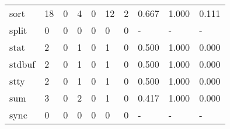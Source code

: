 \begin{longtable}{lp{2.0cm}p{2.0cm}p{2.0cm}p{2.0cm}p{2.0cm}p{2.0cm}p{2.0cm}p{2.0cm}p{2.0cm}}
sort      &                     18 &                                             0 &                                            4 &                                           0 &                                           12 &                                          2 &                                0.667 &                                  1.000 &                                0.111 \\
split     &                      0 &                                             0 &                                            0 &                                           0 &                                            0 &                                          0 &                                    - &                                      - &                                    - \\
stat      &                      2 &                                             0 &                                            1 &                                           0 &                                            1 &                                          0 &                                0.500 &                                  1.000 &                                0.000 \\
stdbuf    &                      2 &                                             0 &                                            1 &                                           0 &                                            1 &                                          0 &                                0.500 &                                  1.000 &                                0.000 \\
stty      &                      2 &                                             0 &                                            1 &                                           0 &                                            1 &                                          0 &                                0.500 &                                  1.000 &                                0.000 \\
sum       &                      3 &                                             0 &                                            2 &                                           0 &                                            1 &                                          0 &                                0.417 &                                  1.000 &                                0.000 \\
sync      &                      0 &                                             0 &                                            0 &                                           0 &                                            0 &                                          0 &                                    - &                                      - &                                    - \\

\end{longtable}
